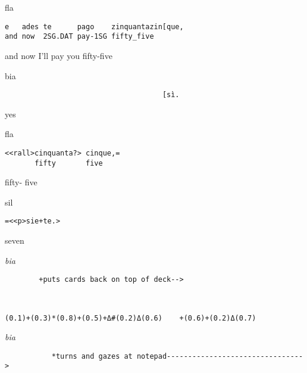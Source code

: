 \documentclass[output=paper,modfonts]{langscibook}
\begin{document}
\vspace{2mm}
%
\begin{transbox}{1}{fla}
\begin{verbatim}
e   ades te      pago    zinquantazin[que,
and now  2SG.DAT pay-1SG fifty_five
\end{verbatim}
and now I'll pay you fifty-five
\end{transbox}
%
\begin{transbox}{2}{bia}
\begin{verbatim}
                                     [sì.
\end{verbatim}
\hspace{5.6cm} yes
\end{transbox}\vspace{-1mm}
%
\vspace{-1mm}
%
\begin{transbox}{4}{fla}
\begin{verbatim}
<<rall>cinquanta?> cinque,=
       fifty       five
\end{verbatim}
\hspace{0.95cm} fifty- \hspace{1.05cm} five
\end{transbox}\vspace{1mm}
%
\begin{transbox}{5}{sil}
\begin{verbatim}
=<<p>sie+te.>
\end{verbatim}
\hspace{0.7cm} seven
\end{transbox}\vspace{1mm}
%
\begin{transbox}{6}{\textit{bia}}
\begin{verbatim}
        +puts cards back on top of deck-->
\end{verbatim}
\end{transbox}
%
\begin{transbox}{7}{~}
\begin{verbatim}
(0.1)+(0.3)*(0.8)+(0.5)+Δ#(0.2)Δ(0.6)    +(0.6)+(0.2)Δ(0.7)
\end{verbatim}
\end{transbox}
%
\begin{transbox}{8}{\textit{bia}}
\begin{verbatim}
           *turns and gazes at notepad-------------------------------->
\end{verbatim}
\end{transbox}
\end{document}
